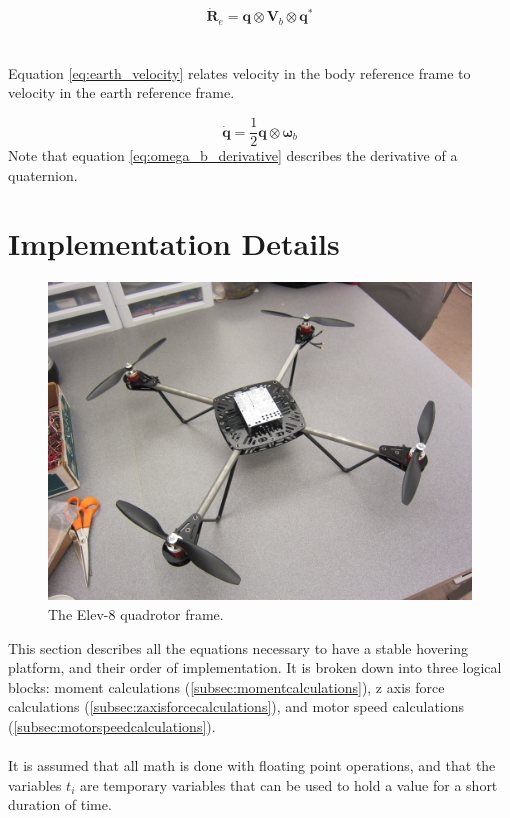 \documentclass{article}
\numberwithin{equation}{section} %
\begin{document}
\begin{equation} \label{eq:earth_velocity}
\dot{\boldsymbol{R}}_e = \boldsymbol{q} \otimes \boldsymbol{V}_b \otimes \boldsymbol{q}^*
\end{equation}
\\ \\
Equation \eqref{eq:earth_velocity} relates velocity in the body reference frame to velocity in the earth reference frame.




\begin{equation} \label{eq:omega_b_derivative}
\dot{\boldsymbol{q}} = \frac{1}{2} \boldsymbol{q} \otimes \boldsymbol{\omega}_b
\end{equation}
Note that equation \eqref{eq:omega_b_derivative} describes the derivative of a quaternion.

\clearpage %
\section{Implementation Details}
\begin{figure}
  \centering
    \includegraphics[scale=.07]{basic_quadrotor_platform.JPG}
  \caption{The Elev-8 quadrotor frame.}
\end{figure}  
  
  
This section describes all the equations necessary to have a stable hovering platform, and their order of implementation. It is broken down into three logical blocks: moment calculations (\ref{subsec:momentcalculations}), z axis force calculations (\ref{subsec:zaxisforcecalculations}), and motor speed calculations (\ref{subsec:motorspeedcalculations}). 
\\ \\
It is assumed that all math is done with floating point operations, and that the variables $t_i$ are temporary variables that can be used to hold a value for a short duration of time.
\end{document}
